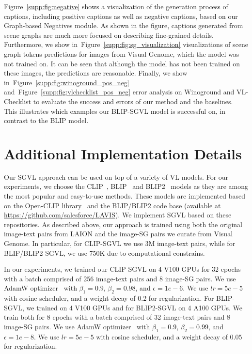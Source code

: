 \documentclass[11pt]{article}
\newcommand{\figgref}[1]{Figure~\ref{#1}}
\newcommand{\smodel}{SGVL}
\begin{document}
\label{supp:qual}




\figgref{supp:fig:negative} shows a visualization of the generation process of captions, including positive captions as well as negative captions, based on our Graph-based Negatives module. As shown in the figure, captions generated from scene graphs are much more focused on describing fine-grained details. Furthermore, we show in~\figgref{supp:fig:sg_visualization} visualizations of scene graph tokens predictions for images from Visual Genome, which the model was not trained on. It can be seen that although the model has not been trained on these images, the predictions are reasonable. Finally, we show in~\figgref{supp:fig:winoground_pos_neg} and~\figgref{supp:fig:vlchecklist_pos_neg} error analysis on Winoground and VL-Checklist to evaluate the success and errors of our method and the baselines. This illustrates which examples our BLIP-SGVL model is successful on, in contrast to the BLIP model.

















\section{Additional Implementation Details}
\label{supp:impl}

Our {\smodel} approach can be used on top of a variety of VL models. For our experiments, we choose the CLIP~\cite{radford2021learning}, BLIP~\cite{blip} and BLIP2~\cite{li2023blip2} models as they are among the most popular and easy-to-use methods. These models are implemented based on the Open-CLIP library~\cite{openclip} and the BLIP/BLIP2 code base (available at \url{https://github.com/salesforce/LAVIS}). We implement {\smodel} based on these repositories. As described above, our approach is trained using both the original image-text pairs from LAION and the image-SG pairs we curate from Visual Genome. In particular, for CLIP-SGVL we use 3M image-text pairs, while for BLIP/BLIP2-SGVL, we use 750K due to computational constrains. 

In our experiments, we trained our CLIP-SGVL on 4 V100 GPUs for 32 epochs with a batch comprised of 256 image-text pairs and 8 image-SG pairs. We use AdamW optimizer~\cite{kingma2014adam,Loshchilov2017AdamW} with $\beta_1= 0.9$, $\beta_2= 0.98$, and $\epsilon=1e-6$. We use $lr = 5e-5$ with cosine scheduler, and a weight decay of $0.2$ for regularization. For BLIP-SGVL, we trained on 4 V100 GPUs and for BLIP2-SGVL on 4 A100 GPUs. We train both for 8 epochs with a batch comprised of 32 image-text pairs and 8 image-SG pairs. We use AdamW optimizer~\cite{kingma2014adam} with $\beta_1= 0.9$, $\beta_2= 0.99$, and $\epsilon=1e-8$. We use $lr = 5e-5$ with cosine scheduler, and a weight decay of $0.05$ for regularization. 
\end{document}
